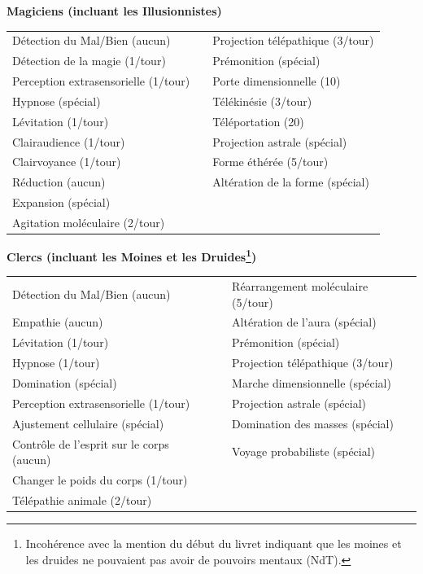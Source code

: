 \documentclass[11pt]{article}
\begin{document}
{\bigskip

\textbf{Magiciens (incluant les Illusionnistes)}

\bigskip

\begin{tabular}{p{7.5cm}p{0.3cm}p{7.5cm}}
Détection du Mal/Bien (aucun) && Projection télépathique (3/tour) \\
Détection de la magie (1/tour) && Prémonition (spécial) \\
Perception extrasensorielle (1/tour) && Porte dimensionnelle (10) \\
Hypnose (spécial) && Télékinésie (3/tour) \\
Lévitation (1/tour) && Téléportation (20) \\
Clairaudience (1/tour) && Projection astrale (spécial) \\
Clairvoyance (1/tour) && Forme éthérée (5/tour) \\
Réduction (aucun) && Altération de la forme (spécial) \\
Expansion (spécial) && \\
Agitation moléculaire (2/tour) && \\
\end{tabular}

\bigskip

\textbf{Clercs (incluant les Moines et les Druides\footnote{Incohérence avec la mention du début du livret indiquant que les moines et les druides ne pouvaient pas avoir de pouvoirs mentaux (NdT).})}

\bigskip

\begin{tabular}{p{7.5cm}p{0.3cm}p{7.5cm}}
Détection du Mal/Bien (aucun) && Réarrangement moléculaire (5/tour) \\
Empathie (aucun) && Altération de l'aura (spécial) \\
Lévitation (1/tour) && Prémonition (spécial) \\
Hypnose (1/tour) && Projection télépathique (3/tour) \\
Domination (spécial) && Marche dimensionnelle (spécial) \\
Perception extrasensorielle (1/tour) && Projection astrale (spécial) \\
Ajustement cellulaire (spécial) && Domination des masses (spécial) \\
Contrôle de l'esprit sur le corps (aucun) &&  Voyage probabiliste (spécial) \\
Changer le poids du corps (1/tour) && \\
Télépathie animale (2/tour) && \\
\end{tabular}

}
\end{document}
